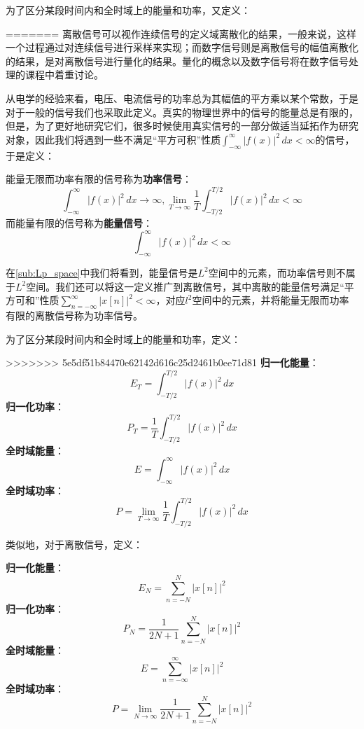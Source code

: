 为了区分某段时间内和全时域上的能量和功率，又定义：\begin{definition}
=======
离散信号可以视作连续信号的定义域离散化的结果，一般来说，这样一个过程通过对连续信号进行采样来实现；而数字信号则是离散信号的幅值离散化的结果，是对离散信号进行量化的结果。量化的概念以及数字信号将在数字信号处理的课程中着重讨论。

从电学的经验来看，电压、电流信号的功率总为其幅值的平方乘以某个常数，于是对于一般的信号我们也采取此定义。真实的物理世界中的信号的能量总是有限的，但是，为了更好地研究它们，很多时候使用真实信号的一部分做适当延拓作为研究对象，因此我们将遇到一些不满足“平方可积”性质$\int_{-\infty}^{\infty}| f(x)| ^2\,dx<\infty$的信号，于是定义：
\begin{definition}[功率信号与能量信号]
能量无限而功率有限的信号称为\textbf{功率信号}：
\[\int_{-\infty}^{\infty}| f(x)| ^2\,dx\to\infty,\lim_{T \to \infty}\frac{1}{T}\int_{-T/2}^{T/2}| f(x)|^2  \,dx<\infty\]
而能量有限的信号称为\textbf{能量信号}：
\[\int_{-\infty}^{\infty}| f(x)| ^2\,dx<\infty\]
\end{definition}

在\ref{sub:Lp_space}中我们将看到，能量信号是$L^2$空间中的元素，而功率信号则不属于$L^2$空间。我们还可以将这一定义推广到离散信号，其中离散的能量信号满足“平方可和”性质$\sum_{n=-\infty}^{\infty}|x[n]|^2<\infty$，对应$l^2$空间中的元素，并将能量无限而功率有限的离散信号称为功率信号。

为了区分某段时间内和全时域上的能量和功率，定义：\begin{definition}
>>>>>>> 5e5df51b84470e62142d616c25d2461b0ee71d81
\quad\newline
    \textbf{归一化能量}：$$E_T=\int_{-T/2}^{T/2}| f(x)| ^2\,dx$$
    \textbf{归一化功率}：$$P_T=\dfrac{1}{T}\int_{-T/2}^{T/2}| f(x)| ^2\,dx$$
\textbf{全时域能量}：$$E=\int_{-\infty}^{\infty}| f(x)| ^2\,dx$$
\textbf{全时域功率}：$$P=\lim_{T \to \infty}  \dfrac{1}{T}\int_{-T/2}^{T/2}| f(x)| ^2\,dx$$
\end{definition}

类似地，对于离散信号，定义：
\begin{definition}
    \quad\newline
    \textbf{归一化能量}：$$E_N=\sum_{n = -N}^{N}  |x[n]| ^2$$
    \textbf{归一化功率}：$$P_N=\dfrac{1}{2N+1}\sum_{n = -N}^{N}  |x[n]| ^2$$
\textbf{全时域能量}：$$E=\sum_{n = -\infty}^{\infty}  |x[n]| ^2$$
\textbf{全时域功率}：$$P=\lim_{N \to \infty}  \dfrac{1}{2N+1}\sum_{n = -N}^{N}  |x[n]| ^2$$
\end{definition}


\end{definition}
